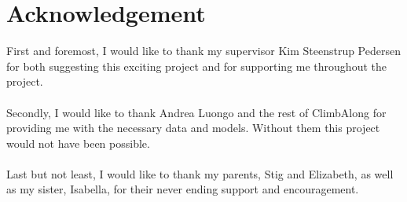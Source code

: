 \documentclass[./main.tex]{subfiles}
\begin{document}
\section*{Acknowledgement}
First and foremost, I would like to thank my supervisor Kim Steenstrup Pedersen for both suggesting this exciting project and for supporting me throughout the project.
\\
\\
Secondly, I would like to thank Andrea Luongo and the rest of ClimbAlong for providing me with the necessary data and models. Without them this project would not have been possible.
\\
\\
Last but not least, I would like to thank my parents, Stig and Elizabeth, as well as my sister, Isabella, for their never ending support and encouragement.
\end{document}
